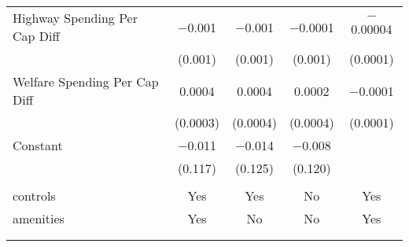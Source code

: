 \begin{table}[!htbp]
\begin{tabular}{@{\extracolsep{5pt}}lcccc}
  Highway Spending Per Cap Diff & $-$0.001 & $-$0.001 & $-$0.0001 & $-$0.00004 \\ 
  & (0.001) & (0.001) & (0.001) & (0.0001) \\ 
  Welfare Spending Per Cap Diff & 0.0004 & 0.0004 & 0.0002 & $-$0.0001 \\ 
  & (0.0003) & (0.0004) & (0.0004) & (0.0001) \\ 
  Constant & $-$0.011 & $-$0.014 & $-$0.008 &  \\ 
  & (0.117) & (0.125) & (0.120) &  \\ 
 \hline \\[-1.8ex] 
controls & Yes & Yes & No & Yes \\ 
amenities & Yes & No & No & Yes \\ 
\hline \\[-1.8ex] 
\hline 
\hline \\[-1.8ex] 
\end{tabular} 
\end{table} 
